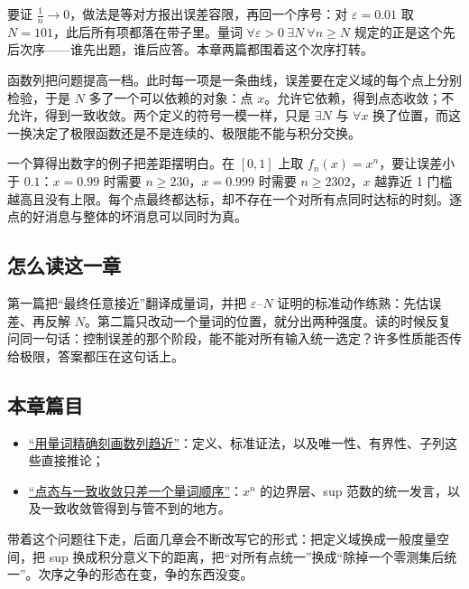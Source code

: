 要证 \(\frac1n\to0\)，做法是等对方报出误差容限，再回一个序号：对 \(\varepsilon=0.01\) 取 \(N=101\)，此后所有项都落在带子里。量词 \(\forall\varepsilon>0\ \exists N\ \forall n\ge N\) 规定的正是这个先后次序——谁先出题，谁后应答。本章两篇都围着这个次序打转。

函数列把问题提高一档。此时每一项是一条曲线，误差要在定义域的每个点上分别检验，于是 \(N\) 多了一个可以依赖的对象：点 \(x\)。允许它依赖，得到点态收敛；不允许，得到一致收敛。两个定义的符号一模一样，只是 \(\exists N\) 与 \(\forall x\) 换了位置，而这一换决定了极限函数还是不是连续的、极限能不能与积分交换。

一个算得出数字的例子把差距摆明白。在 \([0,1]\) 上取 \(f_n(x)=x^n\)，要让误差小于 \(0.1\)：\(x=0.99\) 时需要 \(n\ge230\)，\(x=0.999\) 时需要 \(n\ge2302\)，\(x\) 越靠近 1 门槛越高且没有上限。每个点最终都达标，却不存在一个对所有点同时达标的时刻。逐点的好消息与整体的坏消息可以同时为真。

\subsection{怎么读这一章}

第一篇把``最终任意接近''翻译成量词，并把 \(\varepsilon\)--\(N\) 证明的标准动作练熟：先估误差、再反解 \(N\)。第二篇只改动一个量词的位置，就分出两种强度。读的时候反复问同一句话：控制误差的那个阶段，能不能对所有输入统一选定？许多性质能否传给极限，答案都压在这句话上。

\subsection{本章篇目}

\begin{itemize}
\tightlist
\item \hyperref[sec:12-Real-Analysis-Support/02-Convergence/01]{``用量词精确刻画数列趋近''}：定义、标准证法，以及唯一性、有界性、子列这些直接推论；
\item \hyperref[sec:12-Real-Analysis-Support/02-Convergence/02]{``点态与一致收敛只差一个量词顺序''}：\(x^n\) 的边界层、sup 范数的统一发言，以及一致收敛管得到与管不到的地方。
\end{itemize}

带着这个问题往下走，后面几章会不断改写它的形式：把定义域换成一般度量空间，把 sup 换成积分意义下的距离，把``对所有点统一''换成``除掉一个零测集后统一''。次序之争的形态在变，争的东西没变。

